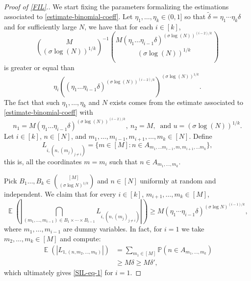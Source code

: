 \documentclass[letter, 11pt]{article}
\theoremstyle{plain} %
\theoremstyle{definition} %
\theoremstyle{plain}
\theoremstyle{plain}
\renewcommand{\P}{\mathbb{P}}
\newcommand{\1}{\mathbbm{1}}
\newcommand{\E}{\operatorname{\mathbb{E}}}
\begin{document}
\begin{proof}[Proof of \cref{FIL}.]
We start fixing the parameters formalizing the estimations associated to \cref{estimate-binomial-coeff}. Let $\eta_1,\ldots,\eta_k\in (0,1]$ so that $\tilde{\delta}=\eta_1\cdots\eta_k\delta$ and for sufficiently large $N$, we have that for each $i\in [k]$,
$$     \binom{M}{(\sigma \log(N))^{1/k}}^{-1}\binom{M (\eta_1\ldots\eta_{i-1}\delta)^{(\sigma \log(N))^{(i-2)/k}}}{(\sigma \log(N))^{1/k}}     $$
is greater or equal than
$$ \eta_i \left(  (\eta_1\ldots\eta_{i-1}\delta)^{(\sigma \log(N))^{(i-2)/k}}  \right)^{(\sigma \log(N))^{1/k}}.$$
The fact that such $\eta_1,\ldots,\eta_k$ and $N$ exists comes from the estimate associated to \cref{estimate-binomial-coeff} with $$n_1=M (\eta_1\ldots\eta_{i-1}\delta)^{(\sigma \log(N))^{(i-2)/k}},~n_2=M,~ \text{ and }u=(\sigma \log(N))^{1/k}.$$
Let $i\in [k]$, $n\in[N]$, and $m_1,\ldots,m_{i-1},m_{i+1},\ldots,m_k\in [N]$. Define
    $$L_{i,(n,(m_j)_{j\neq i})}=\{m\in [M] : n\in A_{m_1,\ldots m_{i-1}, m ,m_{i+1}, \ldots m_k}\}, $$
this is, all the coordinates $m=m_i$ such that $n\in A_{m_1,\ldots,m_k}$. 
    
    Pick $B_1\ldots,B_k\in \binom{[M]}{(\sigma \log{N})^{1/k}}$ and $n\in [N]$ uniformly at random and independent. We claim that for every $i\in [k]$, $m_{i+1},\ldots,m_k\in [M]$,
    \begin{equation}\label{SIL-eq-1}
         \E\left( \left| \bigcap_{( m_1,\ldots,m_{i-1})\in  B_1\times \cdots \times B_{i-1} } L_{i,(n,(m_j)_{j\neq i })} \right| \right)\geq M(\eta_1\cdots\eta_{i-1}\delta)^{(\sigma \log{N})^{(i-1)/k}},
    \end{equation}
    where $m_1,\ldots,m_{i-1}$ are dummy variables. In fact, for $i=1$ we take $m_2,\ldots,m_k\in [M]$ and compute:
    \begin{align*}
        \E\left( \left|  L_{1,(n,m_2,\ldots,m_k)} \right| \right)&= \sum_{m_1\in [M]} \P( n \in A_{m_1,\ldots,m_k})\\
        &\geq  M\delta \geq M\delta',
    \end{align*}   
    which ultimately gives \cref{SIL-eq-1} for $i=1$.
    

\end{proof}
\end{document}
